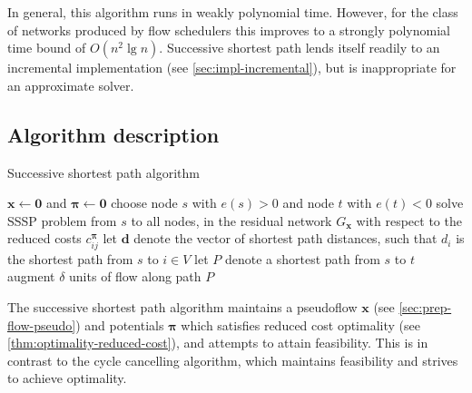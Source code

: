 
In general, this algorithm runs in weakly polynomial time. However, for the class of networks produced by flow schedulers this improves to a strongly polynomial time bound of $O(n^2 \lg n)$. Successive shortest path lends itself readily to an incremental implementation (see \cref{sec:impl-incremental}), but is inappropriate for an approximate solver.

\subsection{Algorithm description}

\begin{algorithm}
    \caption{Successive shortest path algorithm}
    \label{algo:successive-shortest-path}
    \begin{algorithmic}[1]
        \State $\mathbf{x} \gets \mathbf{0}$ and $\boldsymbol{\pi} \gets \mathbf{0}$
          \State choose node $s$ with $e(s) > 0$ and node $t$ with $e(t) < 0$\footnotemark
          \State solve SSSP problem from $s$ to all nodes, in the residual network $G_{\mathbf{x}}$ with respect to the reduced costs $c^{\boldsymbol{\pi}}_{ij}$
          \State let $\mathbf{d}$ denote the vector of shortest path distances, such that $d_i$ is the shortest path from $s$ to $i\in V$
          \State let $P$ denote a shortest path from $s$ to $t$
          \State augment $\delta$ units of flow along path $P$
        \EndWhile
    \end{algorithmic}
\end{algorithm}


The successive shortest path algorithm maintains a pseudoflow $\mathbf{x}$ (see \cref{sec:prep-flow-pseudo}) and potentials $\boldsymbol{\pi}$ which satisfies reduced cost optimality (see \cref{thm:optimality-reduced-cost}), and attempts to attain feasibility. This is in contrast to the cycle cancelling algorithm, which maintains feasibility and strives to achieve optimality.


